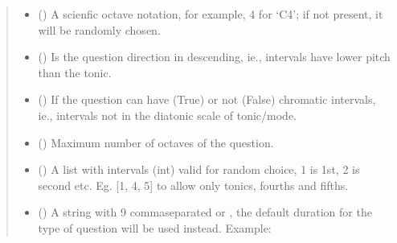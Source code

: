 \documentclass[letterpaper,10pt,english]{sphinxmanual}
\begin{document}
\begin{fulllineitems}
\begin{fulllineitems}
\begin{quote}
\begin{description}
\begin{itemize}
\item {} 
\sphinxAtStartPar
{} () \textendash{} A scienfic octave notation, for example, 4 for ‘C4’;
if not present, it will be randomly chosen.

\item {} 
\sphinxAtStartPar
{} () \textendash{} Is the question direction in descending, ie.,
intervals have lower pitch than the tonic.

\item {} 
\sphinxAtStartPar
{} () \textendash{} If the question can have (True) or not (False)
chromatic intervals, ie., intervals not in the diatonic scale
of tonic/mode.

\item {} 
\sphinxAtStartPar
{} () \textendash{} Maximum number of octaves of the question.

\item {} 
\sphinxAtStartPar
{} () \textendash{} A list with intervals (int) valid for
random choice, 1 is 1st, 2 is second etc. Eg. {[}1, 4, 5{]} to
allow only tonics, fourths and fifths.

\item {} 
\sphinxAtStartPar
{} () \textendash{} 
\sphinxAtStartPar
A string with 9 comma\sphinxhyphen{}separated  or
, the
default duration for the type of question will be used instead.
Example:


\end{itemize}
\end{description}
\end{quote}
\end{fulllineitems}
\end{fulllineitems}
\end{document}
